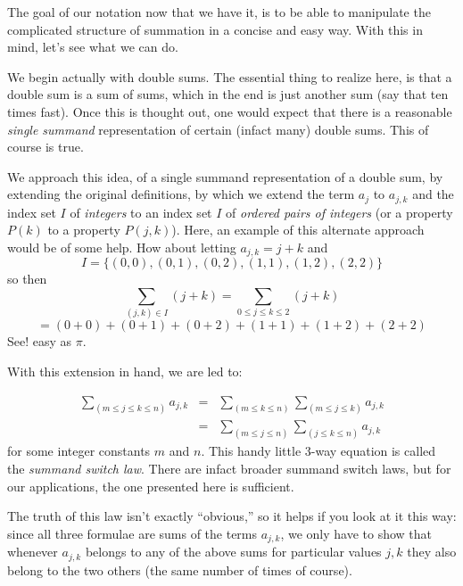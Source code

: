 \documentclass[twoside]{article}
\begin{document}
The goal of our notation now that we have it, is to be
able to manipulate the complicated structure of summation
in a concise and easy way.  With this in mind, let's see
what we can do.   

We begin actually with double sums.  The essential thing to 
realize here, is that a double sum is a sum of sums, which 
in the end is just another sum (say that ten times fast).  
Once this is thought out, one would expect that there is a 
reasonable \emph{single summand} representation of certain 
(infact many) double sums.  This of course is true.  

We approach this idea, of a single summand representation of 
a double sum, by extending the original definitions, by which 
we extend the term $  a_j  $ to $  a_{j,k}  $ and the index set 
$  I  $ of \emph{integers} to an index set $  I  $ of 
\emph{ordered pairs of integers} (or a property $  P(k)  $ to a 
property $  P(j,k)  $).  Here, an example of this alternate 
approach would be of some help.  How about letting 
$  a_{j,k}=j+k  $ and
$$  I=\{ (0,0),(0,1),(0,2),(1,1),(1,2),(2,2)\}  $$
so then 
$$  \sum_{(j,k)\in I}\!\! (j+k)=\sum_{0\le j\le k\le 2}\!\!\!\!\! (j+k)  $$
$$  =(0+0)+(0+1)+(0+2)+(1+1)+(1+2)+(2+2)  $$
See!  easy as $  \pi  $.   

With this extension in hand, we are led to: 

\begin{eqnarray*}
\sum_{(m\le j\le k\le n)}\!\!\!\!\!\!\!\!\! a_{j,k}                         
 & = & \sum_{(m\le k\le n)}\sum_{(m\le j\le k)}\!\!\!\!\! a_{j,k} \\
 & = & \sum_{(m\le j\le n)}\sum_{(j\le k\le n)}\!\!\!\! a_{j,k}
\end{eqnarray*} for some integer constants $  m  $ and $  n  $.   
This handy little 3-way equation is called the \emph{summand 
switch law}.  There are infact broader summand switch laws, 
but for our applications, the one presented here is sufficient. 

The truth of this law isn't exactly ``obvious,'' so it helps if
you look at it this way: since all three formulae are sums of the 
terms $  a_{j,k}  $, we only have to show that whenever 
$  a_{j,k}  $ belongs to any of the above sums for particular 
values $  j,k  $ they also belong to the two others (the same 
number of times of course). 
\end{document}
